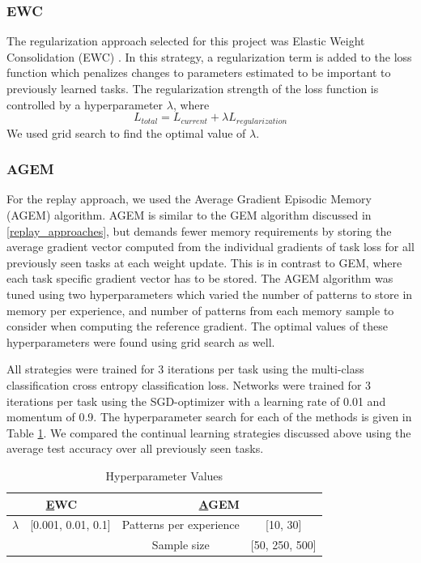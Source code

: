 \documentclass{article}
\begin{document}
\subsubsection{EWC}
The regularization approach selected for this project was Elastic Weight Consolidation (EWC) \cite{kirkpatrick2017overcoming}. In this strategy, a regularization term is added to the loss function which penalizes changes to parameters estimated to be important to previously learned tasks.  The regularization strength of the loss function is controlled by a hyperparameter $\lambda$, where
\[L_{total} = L_{current} + \lambda L_{regularization}\] 
We used grid search to find the optimal value of $\lambda$. 

\subsubsection{AGEM}
For the replay approach, we used the Average Gradient Episodic Memory (AGEM) \cite{chaudhry2018efficient} algorithm. AGEM is similar to the GEM algorithm discussed in \ref{replay_approaches}, but demands fewer memory requirements by storing the average gradient vector computed from the individual gradients of task loss for all previously seen tasks at each weight update. This is in contrast to GEM, where each task specific gradient vector has to be stored. The AGEM algorithm was tuned using two hyperparameters which varied the number of patterns to store in memory per experience, and number of patterns from each memory sample to consider when computing the reference gradient. The optimal values of these hyperparameters were found using grid search as well.

All strategies were trained for 3 iterations per task using the multi-class classification cross entropy classification loss. Networks were trained for 3 iterations per task using the SGD-optimizer with a learning rate of 0.01 and momentum of 0.9. The hyperparameter search for each of the methods is given in Table \ref{Tab:Hyperparameters}. We compared the continual learning strategies discussed above using the average test accuracy over all previously seen tasks.

\begin{table}[h]
\centering
\caption{Hyperparameter Values}
\begin{tabular}{|c|c|c|c|}
\hline
\multicolumn{2}{|c|}{{\ul EWC}}                                   & \multicolumn{2}{c|}{{\ul AGEM}}              \\ \hline
\multirow{}{}{$\lambda$} & \multirow{}{}{{[0.001, 0.01, 0.1]}} & Patterns per experience & {[10, 30]}       \\ \cline{3-4} 
                        &                                         & Sample size             & {[50, 250, 500]} \\ \hline
\end{tabular}
\label{Tab:Hyperparameters}
\end{table}
\end{document}
